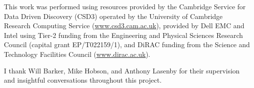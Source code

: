 \begin{acknowledgments}

This work was performed using resources provided by the Cambridge Service
for Data Driven Discovery (CSD3) operated by the University of Cambridge
Research Computing Service (\url{www.csd3.cam.ac.uk}), provided by Dell EMC
and Intel using Tier-2 funding from the Engineering and Physical Sciences
Research Council (capital grant EP/T022159/1), and DiRAC funding from the
Science and Technology Facilities Council (\url{www.dirac.ac.uk}).

I thank Will Barker, Mike Hobson, and Anthony Lasenby for their
supervision and insightful conversations throughout this project.

\end{acknowledgments}
